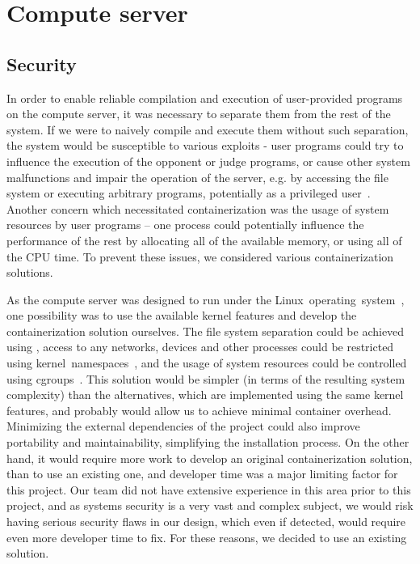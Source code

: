\chapter{Compute server}
\label{chap:compute}

\section{Security} %

In order to enable reliable compilation and execution of user-provided programs on the compute server, it was necessary to separate them from the rest of the
system. If we were to naively compile and execute them without such separation,
the system would be susceptible to various exploits - user programs could try
to influence the execution of the opponent or judge programs, or cause other
system malfunctions and impair the operation of the server, e.g. by accessing
the file system or executing arbitrary programs, potentially as a privileged
user~\cite{Forivsek2006}.  Another concern which necessitated containerization
was the usage of system resources by user programs -- one process could
potentially influence the performance of the rest by allocating all of the
available memory, or using all of the CPU time. To prevent these issues, we
considered various containerization solutions.


As the compute server was designed to run under the
Linux~operating~system~\cite{linux}, one possibility was to use the available
kernel features and develop the containerization solution ourselves. The file
system separation could be achieved using , access to any
networks, devices and other processes could be restricted using
kernel~namespaces~\cite{namespaces}, and the usage of system resources could be
controlled using cgroups~\cite{cgroups}. This solution would be simpler (in
terms of the resulting system complexity) than the alternatives, which are
implemented using the same kernel features, and probably would allow us to
achieve minimal container overhead.  Minimizing the external dependencies of
the project could also improve portability and maintainability, simplifying the
installation process. On the other hand, it would require more work to develop
an original containerization solution, than to use an existing one, and
developer time was a major limiting factor for this project. Our team did not
have extensive experience in this area prior to this project, and as systems
security is a very vast and complex subject, we would risk having serious
security flaws in our design, which even if detected, would require even more
developer time to fix. For these reasons, we decided to use an existing
solution.


